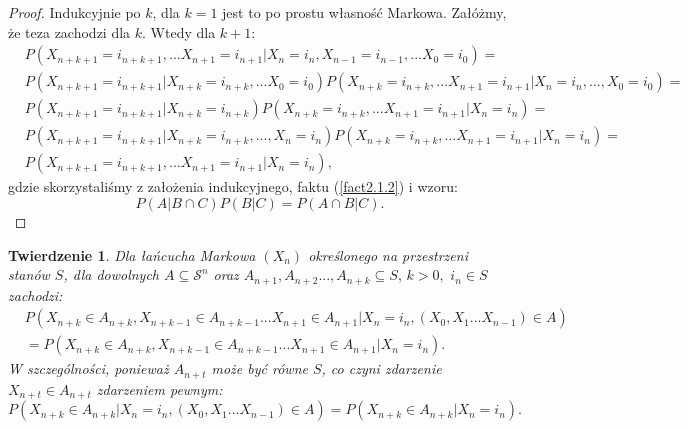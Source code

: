 \documentclass[a4paper]{article}
\theoremstyle{defn}
\theoremstyle{theorem}
\newtheorem{theorem}[defn]{Twierdzenie}
\theoremstyle{lemma}
\theoremstyle{cor}
\theoremstyle{fact}
\begin{document}
\begin{proof}
Indukcyjnie po $k$, dla $k = 1$ jest to po prostu własność Markowa. Załóżmy, że teza zachodzi dla $k$. Wtedy dla $k+1$:
\begin{align*}
    &P(X_{n+k+1} = i_{n+k+1}, ...X_{n+1} = i_{n+1} | X_n = i_n, X_{n-1} = i_{n-1}, ... X_0 = i_0) = \\
    & P(X_{n+k+1} = i_{n+k+1}|X_{n+k} = i_{n+k}, ... X_0 = i_0)P(X_{n+k} = i_{n+k}, ...X_{n+1} = i_{n+1} | X_n = i_n, ..., X_0=i_0) =\\
    & P(X_{n+k+1} = i_{n+k+1}|X_{n+k} = i_{n+k})P(X_{n+k} = i_{n+k}, ...X_{n+1} = i_{n+1} | X_n = i_n) =\\
    & P(X_{n+k+1} = i_{n+k+1}|X_{n+k} = i_{n+k}, ..., X_n=i_n)P(X_{n+k} = i_{n+k}, ...X_{n+1} = i_{n+1} | X_n = i_n) =\\
    & P(X_{n+k+1} = i_{n+k+1}, ...X_{n+1} = i_{n+1}| X_n = i_n),
\end{align*}
gdzie skorzystaliśmy z założenia indukcyjnego, faktu (\ref{fact2.1.2}) i wzoru: $$P(A| B \cap C)P(B|C) = P(A \cap B |C).$$
\end{proof}
\begin{theorem}\label{theorem2.1.4}
Dla łańcucha Markowa $(X_n)$ określonego na przestrzeni stanów $S$, dla dowolnych $A \subseteq \mathcal{S}^n$ oraz $A_{n+1}, A_{n+2}..., A_{n+k} \subseteq S,\, k>0, \,\, i_n \in S$ zachodzi:
\\
\begin{align*}
&P(X_{n+k} \in A_{n+k}, X_{n+k-1} \in A_{n+k-1}...X_{n+1} \in A_{n+1}|X_n = i_n, (X_{0}, X_{1} ... X_{n-1}) \in A)\\
&= P(X_{n+k} \in A_{n+k}, X_{n+k-1} \in A_{n+k-1}...X_{n+1} \in A_{n+1}|X_n = i_n).
\end{align*}
W szczególności, ponieważ $A_{n+t}$ może być równe $S$, co czyni zdarzenie $X_{n+t} \in A_{n+t}$ zdarzeniem pewnym:\\
$$P(X_{n+k} \in A_{n+k}|X_n = i_n, (X_{0}, X_{1} ... X_{n-1}) \in A) = P(X_{n+k} \in A_{n+k}|X_n = i_n).$$
\end{theorem}
\end{document}
